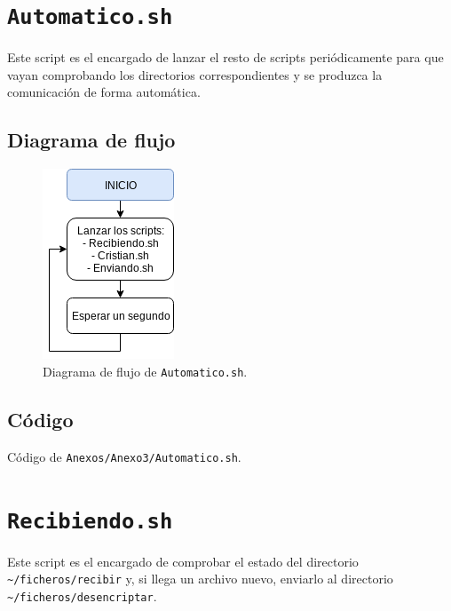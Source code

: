 \newpage
\section{\texttt{Automatico.sh}}
Este script es el encargado de lanzar el resto de scripts periódicamente para que vayan comprobando los directorios correspondientes y se produzca la comunicación de forma automática.

\subsection{Diagrama de flujo}
\begin{figure}[h]
	\centering
	\includegraphics[scale=0.9]{Anexos/Anexo3/Diagramas/Automatico.png}
	\caption{Diagrama de flujo de \texttt{Automatico.sh}.}
	\label{Diagrama de flujo de Automatico.sh}
\end{figure}

\subsection{Código}

\begin{center}
	Código de \texttt{Anexos/Anexo3/Automatico.sh}.
\end{center}


\newpage
\section{\texttt{Recibiendo.sh}}
Este script es el encargado de comprobar el estado del directorio \texttt{\textasciitilde/ficheros/recibir} y, si llega un archivo nuevo, enviarlo al directorio \texttt{\textasciitilde/ficheros/desencriptar}.

